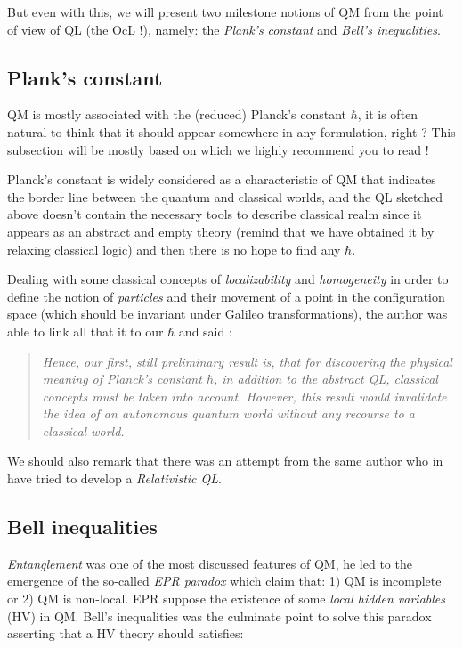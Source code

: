 \documentclass[12pt]{article}
\begin{document}
But even with this, we will present two milestone notions of QM from the point of view of QL (the OcL !), namely: the \textit{Plank's constant} and \textit{Bell's inequalities}.

\subsection*{Plank's constant}

QM is mostly associated with the (reduced) Planck's constant $\hbar$, it is often natural to think that it should appear somewhere in any formulation, right ? This subsection will be mostly based on \cite{plank} which we highly recommend you to read !

Planck's constant is widely considered as a characteristic of QM that indicates the border line between the quantum and classical worlds, and the QL sketched above doesn't contain the necessary tools to describe classical realm since it appears as an abstract and empty theory (remind that we have obtained it by relaxing classical logic) and then there is no hope to find any $\hbar$.

Dealing with some classical concepts of \textit{localizability} and \textit{homogeneity} in order to define the notion of \textit{particles} and their movement of a point in the configuration space (which should be invariant under Galileo transformations), the author \cite{plank} was able to link all that it to our $\hbar$ and said : 

\begin{quote}
\textit{Hence, our first, still preliminary result is, that for discovering the physical meaning of
Planck's constant $\hbar$, in addition to the abstract QL, classical concepts must be taken into account. However, this result would invalidate the idea of an autonomous quantum world without any recourse to a classical world.}
\end{quote}

We should also remark that there was an attempt from the same author who in \cite{relativistic} have tried to develop a \textit{Relativistic QL}.

\vspace{-0.4cm}
\subsection*{Bell inequalities}

\textit{Entanglement} was one of the most discussed features of QM, he led to the emergence of the so-called \textit{EPR paradox} which claim that: 1) QM is incomplete or 2) QM is non-local. EPR suppose the existence of some \textit{local hidden variables} (HV) in QM. Bell's inequalities was the culminate point to solve this paradox asserting that a HV theory should satisfies: 
\end{document}
